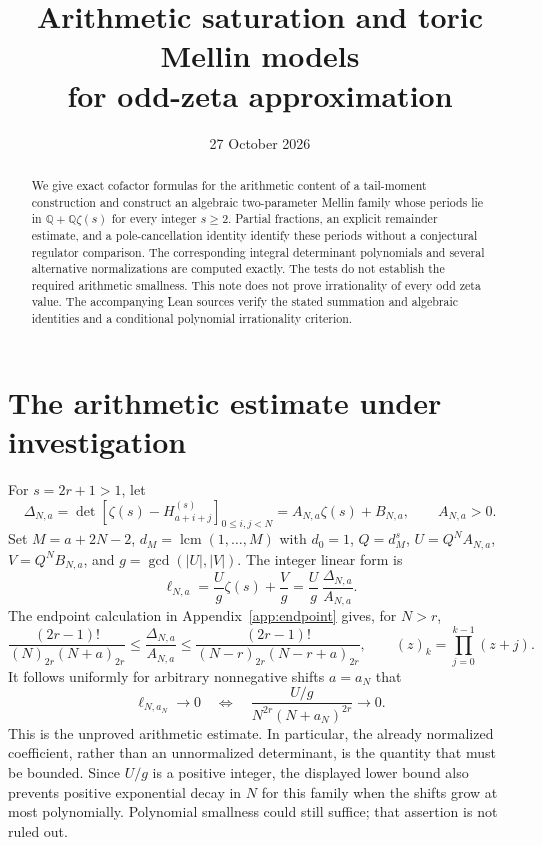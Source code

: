 \documentclass[11pt]{article}
\title{Arithmetic saturation and toric Mellin models\\for odd-zeta approximation}
\author{}
\date{27 October 2026}
\newcommand{\Q}{\mathbb Q}
\newcommand{\HH}[2]{H_{#1}^{(#2)}}
\begin{document}
\maketitle
\begin{abstract}
We give exact cofactor formulas for the arithmetic content of a tail-moment
construction and construct an algebraic two-parameter Mellin family whose
periods lie in $\Q+\Q\zeta(s)$ for every integer $s\ge2$. Partial fractions,
an explicit remainder estimate, and a pole-cancellation identity identify
these periods without a conjectural regulator comparison. The corresponding
integral determinant polynomials and several alternative normalizations are
computed exactly. The tests do not establish the required arithmetic
smallness. This note does not prove irrationality of every odd zeta value.
The accompanying Lean sources verify the stated summation and algebraic
identities and a conditional polynomial irrationality criterion.
\end{abstract}

\section{The arithmetic estimate under investigation}
For $s=2r+1>1$, let
\[
 \Delta_{N,a}=\det[\zeta(s)-\HH{a+i+j}{s}]_{0\le i,j<N}
             =A_{N,a}\zeta(s)+B_{N,a},\qquad A_{N,a}>0 .
\]
Set $M=a+2N-2$, $d_M=\operatorname{lcm}(1,\ldots,M)$ with $d_0=1$, $Q=d_M^s$,
$U=Q^NA_{N,a}$, $V=Q^NB_{N,a}$, and $g=\gcd(|U|,|V|)$.
The integer linear form is
\[
 \ell_{N,a}=\frac Ug\zeta(s)+\frac Vg
           =\frac Ug\,\frac{\Delta_{N,a}}{A_{N,a}}.
\]
The endpoint calculation in Appendix~\ref{app:endpoint} gives, for $N>r$,
\[
 \frac{(2r-1)!}{(N)_{2r}(N+a)_{2r}}
 \le \frac{\Delta_{N,a}}{A_{N,a}}
 \le \frac{(2r-1)!}{(N-r)_{2r}(N-r+a)_{2r}},
 \qquad (z)_k=\prod_{j=0}^{k-1}(z+j).
\]
It follows uniformly for arbitrary nonnegative shifts $a=a_N$ that
\begin{equation}
 \ell_{N,a_N}\longrightarrow0
 \quad\Longleftrightarrow\quad
 \frac{U/g}{N^{2r}(N+a_N)^{2r}}\longrightarrow0 .
 \label{eq:height}
\end{equation}
This is the unproved arithmetic estimate. In particular, the already
normalized coefficient, rather than an unnormalized determinant, is the
quantity that must be bounded. Since $U/g$ is a positive integer, the
displayed lower bound also prevents positive exponential decay in $N$
for this family when the shifts grow at most polynomially. Polynomial
smallness could still suffice; that assertion is not ruled out.
\end{document}
